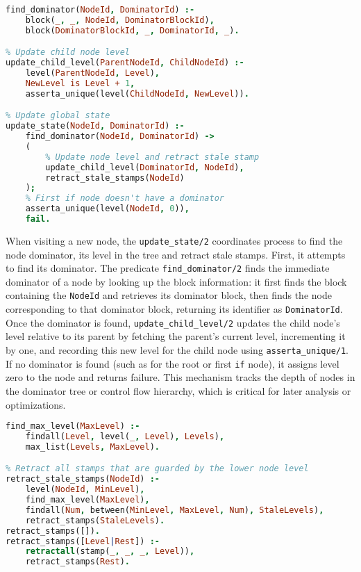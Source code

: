 \smallbreak
\begin{lstlisting}[language=Prolog]
% Predicate to find dominator of a block
find_dominator(NodeId, DominatorId) :-
    block(_, _, NodeId, DominatorBlockId),
    block(DominatorBlockId, _, DominatorId, _).

% Update child node level
update_child_level(ParentNodeId, ChildNodeId) :-
    level(ParentNodeId, Level),
    NewLevel is Level + 1,
    asserta_unique(level(ChildNodeId, NewLevel)).

% Update global state
update_state(NodeId, DominatorId) :-
    find_dominator(NodeId, DominatorId) ->
    (
        % Update node level and retract stale stamp
        update_child_level(DominatorId, NodeId),
        retract_stale_stamps(NodeId)
    );
    % First if node doesn't have a dominator
    asserta_unique(level(NodeId, 0)),
    fail.
\end{lstlisting}
\smallbreak
When visiting a new node, the \texttt{update\_state/2} coordinates process to find the node dominator, its level in the tree and retract stale stamps. First, it attempts to find its dominator. 
The predicate \texttt{find\_dominator/2} finds the immediate dominator of a node by looking up the block information: it first finds the block containing the \texttt{NodeId} and retrieves its dominator block, then finds the node corresponding to that dominator block, returning its identifier as \texttt{DominatorId}. 
Once the dominator is found, \texttt{update\_child\_level/2} updates the child node’s level relative to its parent by fetching the parent’s current level, incrementing it by one, and recording this new level for the child node using \texttt{asserta\_unique/1}. 
If no dominator is found (such as for the root or first \texttt{if} node), it assigns level zero to the node and returns failure. 
This mechanism tracks the depth of nodes in the dominator tree or control flow hierarchy, which is critical for later analysis or optimizations.
\smallbreak
\begin{lstlisting}[language=Prolog]
% Predicate to find the maximum value of levels
find_max_level(MaxLevel) :-
    findall(Level, level(_, Level), Levels),
    max_list(Levels, MaxLevel).

% Retract all stamps that are guarded by the lower node level
retract_stale_stamps(NodeId) :-
    level(NodeId, MinLevel),
    find_max_level(MaxLevel),
    findall(Num, between(MinLevel, MaxLevel, Num), StaleLevels),
    retract_stamps(StaleLevels).
retract_stamps([]).
retract_stamps([Level|Rest]) :-
    retractall(stamp(_, _, _, Level)),
    retract_stamps(Rest).
\end{lstlisting}

